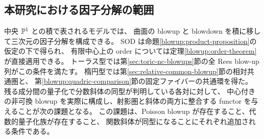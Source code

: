 \subsection{本研究における因子分解の範囲}
\label{blowup:scope}

中央 $\mathbb P^1$ との積で表されるモデルでは、
曲面の blowup と blowdown を積に移して三次元の因子分解を構成できる。
SOD は命題\ref{blowup:product-proposition}の仮定の下で得られ、
有限中心上の order については定理\ref{blowup:order-theorem}が直接適用できる。
トーラス型では第\ref{sec:toric-nc-blowups}節の全 Rees blow-up 列がこの条件を満たす。
楕円型では第\ref{sec:relative-common-blowup}節の相対共通圏と、
第\ref{blowup:quadric-comparison}節の固定ファイバーの共通環を得た。
残る成分間の量子化で分数斜体の同型が判明している各対に対して、
中心付きの非可換 blowup を実際に構成し、射影圏と斜体の両方に整合する
functor を与えることが次の課題となる。
この課題は、Poisson blowup が存在すること、代数的量子化族が存在すること、
関数斜体が同型になることにそれぞれ追加される条件である。
